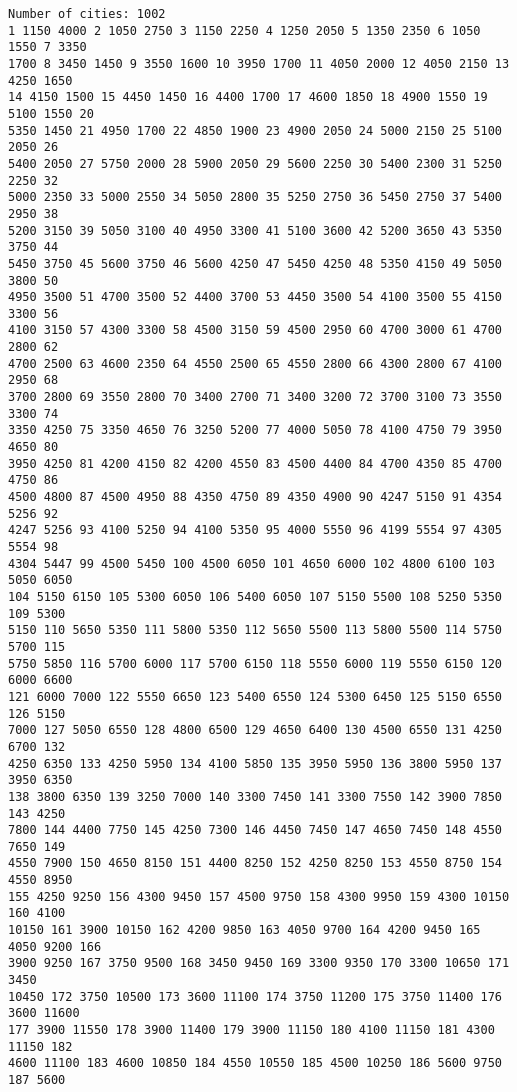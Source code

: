 \documentclass[11pt]{article}
\begin{document}
    \begin{Verbatim}[commandchars=\\\{\}]
Number of cities: 1002
1 1150 4000 2 1050 2750 3 1150 2250 4 1250 2050 5 1350 2350 6 1050 1550 7 3350
1700 8 3450 1450 9 3550 1600 10 3950 1700 11 4050 2000 12 4050 2150 13 4250 1650
14 4150 1500 15 4450 1450 16 4400 1700 17 4600 1850 18 4900 1550 19 5100 1550 20
5350 1450 21 4950 1700 22 4850 1900 23 4900 2050 24 5000 2150 25 5100 2050 26
5400 2050 27 5750 2000 28 5900 2050 29 5600 2250 30 5400 2300 31 5250 2250 32
5000 2350 33 5000 2550 34 5050 2800 35 5250 2750 36 5450 2750 37 5400 2950 38
5200 3150 39 5050 3100 40 4950 3300 41 5100 3600 42 5200 3650 43 5350 3750 44
5450 3750 45 5600 3750 46 5600 4250 47 5450 4250 48 5350 4150 49 5050 3800 50
4950 3500 51 4700 3500 52 4400 3700 53 4450 3500 54 4100 3500 55 4150 3300 56
4100 3150 57 4300 3300 58 4500 3150 59 4500 2950 60 4700 3000 61 4700 2800 62
4700 2500 63 4600 2350 64 4550 2500 65 4550 2800 66 4300 2800 67 4100 2950 68
3700 2800 69 3550 2800 70 3400 2700 71 3400 3200 72 3700 3100 73 3550 3300 74
3350 4250 75 3350 4650 76 3250 5200 77 4000 5050 78 4100 4750 79 3950 4650 80
3950 4250 81 4200 4150 82 4200 4550 83 4500 4400 84 4700 4350 85 4700 4750 86
4500 4800 87 4500 4950 88 4350 4750 89 4350 4900 90 4247 5150 91 4354 5256 92
4247 5256 93 4100 5250 94 4100 5350 95 4000 5550 96 4199 5554 97 4305 5554 98
4304 5447 99 4500 5450 100 4500 6050 101 4650 6000 102 4800 6100 103 5050 6050
104 5150 6150 105 5300 6050 106 5400 6050 107 5150 5500 108 5250 5350 109 5300
5150 110 5650 5350 111 5800 5350 112 5650 5500 113 5800 5500 114 5750 5700 115
5750 5850 116 5700 6000 117 5700 6150 118 5550 6000 119 5550 6150 120 6000 6600
121 6000 7000 122 5550 6650 123 5400 6550 124 5300 6450 125 5150 6550 126 5150
7000 127 5050 6550 128 4800 6500 129 4650 6400 130 4500 6550 131 4250 6700 132
4250 6350 133 4250 5950 134 4100 5850 135 3950 5950 136 3800 5950 137 3950 6350
138 3800 6350 139 3250 7000 140 3300 7450 141 3300 7550 142 3900 7850 143 4250
7800 144 4400 7750 145 4250 7300 146 4450 7450 147 4650 7450 148 4550 7650 149
4550 7900 150 4650 8150 151 4400 8250 152 4250 8250 153 4550 8750 154 4550 8950
155 4250 9250 156 4300 9450 157 4500 9750 158 4300 9950 159 4300 10150 160 4100
10150 161 3900 10150 162 4200 9850 163 4050 9700 164 4200 9450 165 4050 9200 166
3900 9250 167 3750 9500 168 3450 9450 169 3300 9350 170 3300 10650 171 3450
10450 172 3750 10500 173 3600 11100 174 3750 11200 175 3750 11400 176 3600 11600
177 3900 11550 178 3900 11400 179 3900 11150 180 4100 11150 181 4300 11150 182
4600 11100 183 4600 10850 184 4550 10550 185 4500 10250 186 5600 9750 187 5600

\end{Verbatim}
\end{document}
